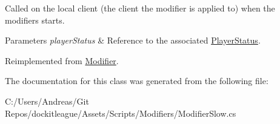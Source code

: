 Called on the local client (the client the modifier is applied to) when the modifiers starts. 


\begin{DoxyParams}{Parameters}
{\em player\+Status} & Reference to the associated \hyperlink{class_player_status}{Player\+Status}.\\
\hline
\end{DoxyParams}


Reimplemented from \hyperlink{class_modifier_a5cce7ec6a5a595265a6bf5a6f7e40eb9}{Modifier}.



The documentation for this class was generated from the following file\+:\begin{DoxyCompactItemize}
\item 
C\+:/\+Users/\+Andreas/\+Git Repos/dockitleague/\+Assets/\+Scripts/\+Modifiers/Modifier\+Slow.\+cs\end{DoxyCompactItemize}
